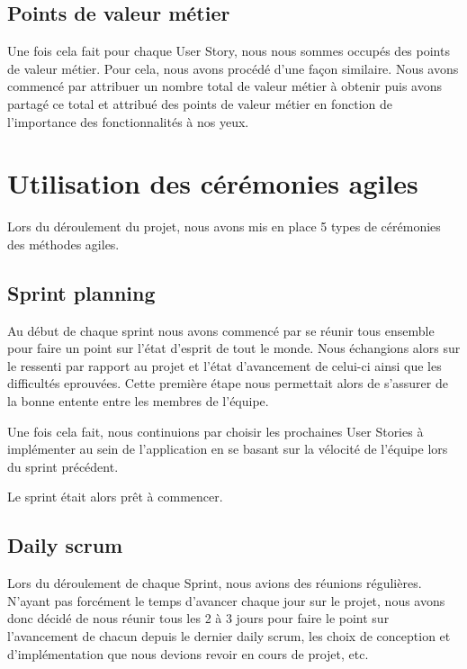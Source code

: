 \documentclass[11pt]{report}
\begin{document}
\subsection{Points de valeur métier}

Une fois cela fait pour chaque User Story, nous nous sommes occupés des points de valeur métier. Pour cela, nous avons procédé d'une façon similaire. Nous avons commencé par attribuer un nombre total de valeur métier à obtenir puis avons partagé ce total et attribué des points de valeur métier en fonction de l'importance des fonctionnalités à nos yeux.

\section{Utilisation des cérémonies agiles}

Lors du déroulement du projet, nous avons mis en place 5 types de cérémonies des méthodes agiles.

\subsection{Sprint planning}

Au début de chaque sprint nous avons commencé par se réunir tous ensemble pour faire un point sur l'état d'esprit de tout le monde.
Nous échangions alors sur le ressenti par rapport au projet et l'état d'avancement de celui-ci ainsi que les difficultés eprouvées. Cette première étape
nous permettait alors de s'assurer de la bonne entente entre les membres de l'équipe.

Une fois cela fait, nous continuions par choisir les prochaines User Stories à implémenter au sein de l'application en se basant sur la vélocité
de l'équipe lors du sprint précédent.\newline

Le sprint était alors prêt à commencer.

\subsection{Daily scrum}

Lors du déroulement de chaque Sprint, nous avions des réunions régulières. N'ayant pas forcément le temps
d'avancer chaque jour sur le projet, nous avons donc décidé de nous réunir tous les 2 à 3 jours
pour faire le point sur l'avancement de chacun depuis le dernier daily scrum, les choix de conception et d'implémentation que
nous devions revoir en cours de projet, etc.
\end{document}
